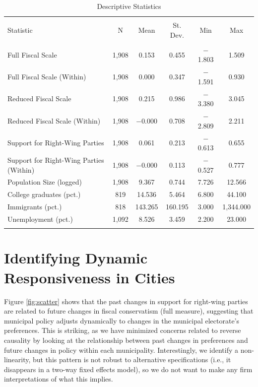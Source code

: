 \documentclass[a4paper,12pt]{article}
\begin{document}
\begin{table}[!htbp] \centering 
	\caption{Descriptive Statistics} 
	\label{tab:desc} 
		\begin{tabular}{@{\extracolsep{5pt}}lccccc} 
			\\[-1.8ex]\hline 
			\hline \\[-1.8ex] 
			Statistic & \multicolumn{1}{c}{N} & \multicolumn{1}{c}{Mean} & \multicolumn{1}{c}{St. Dev.} & \multicolumn{1}{c}{Min} & \multicolumn{1}{c}{Max} \\ 
			\hline \\[-1.8ex] 
			Full Fiscal Scale & 1,908 & 0.153 & 0.455 & $-$1.803 & 1.509 \\ 
			Full Fiscal Scale (Within) & 1,908 & 0.000 & 0.347 & $-$1.591 & 0.930 \\ 
			Reduced Fiscal Scale & 1,908 & 0.215 & 0.986 & $-$3.380 & 3.045 \\ 
			Reduced Fiscal Scale (Within) & 1,908 & $-$0.000 & 0.708 & $-$2.809 & 2.211 \\ 
			Support for Right-Wing Parties & 1,908 & 0.061 & 0.213 & $-$0.613 & 0.655 \\ 
			Support for Right-Wing Parties (Within) & 1,908 & $-$0.000 & 0.113 & $-$0.527 & 0.777 \\ 
			Population Size (logged) & 1,908 & 9.367 & 0.744 & 7.726 & 12.566 \\ 
			College graduates (pct.) & 819 & 14.536 & 5.464 & 6.800 & 44.100 \\ 
			Immigrants (pct.) & 818 & 143.265 & 160.195 & 3.000 & 1,344.000 \\ 
			Unemployment (pct.)& 1,092 & 8.526 & 3.459 & 2.200 & 23.000 \\ 
			\hline \\[-1.8ex] 
		\end{tabular} 
\end{table} 



\section*{Identifying Dynamic Responsiveness in Cities}


Figure \ref{fig:scatter} shows that the past changes in support for right-wing parties are related to future changes in fiscal conservatism (full measure), suggesting that municipal policy adjusts dynamically to changes in the municipal electorate's preferences. This is striking, as we have minimized concerns related to reverse causality by looking at the relationship between past changes in preferences and future changes in policy within each municipality. Interestingly, we identify a non-linearity, but this pattern is not robust to alternative specifications (i.e., it disappears in a two-way fixed effects model), so we do not want to make any firm interpretations of what this implies.
\end{document}
